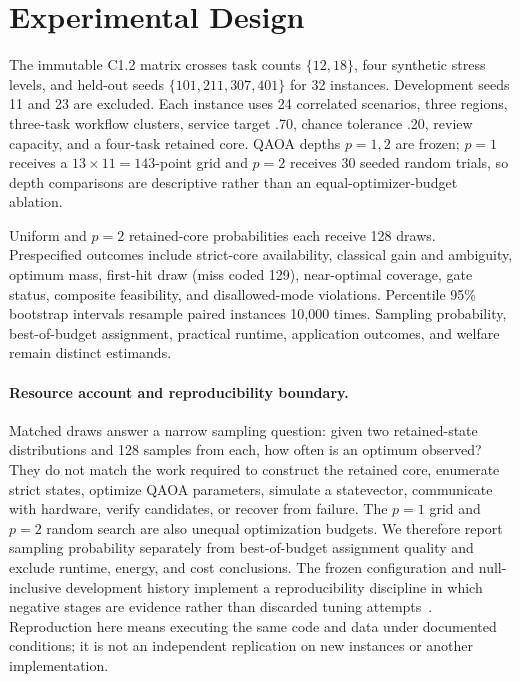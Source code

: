 \section{Experimental Design}
\label{sec:design}
\label{sec:experiments}

The immutable C1.2 matrix crosses task counts $\{12,18\}$, four synthetic stress levels, and held-out seeds $\{101,211,307,401\}$ for 32 instances. Development seeds 11 and 23 are excluded. Each instance uses 24 correlated scenarios, three regions, three-task workflow clusters, service target .70, chance tolerance .20, review capacity, and a four-task retained core. QAOA depths $p=1,2$ are frozen; $p=1$ receives a $13\times11=143$-point grid and $p=2$ receives 30 seeded random trials, so depth comparisons are descriptive rather than an equal-optimizer-budget ablation.

Uniform and $p=2$ retained-core probabilities each receive 128 draws. Prespecified outcomes include strict-core availability, classical gain and ambiguity, optimum mass, first-hit draw (miss coded 129), near-optimal coverage, gate status, composite feasibility, and disallowed-mode violations. Percentile 95\% bootstrap intervals resample paired instances 10,000 times. Sampling probability, best-of-budget assignment, practical runtime, application outcomes, and welfare remain distinct estimands.

\paragraph{Resource account and reproducibility boundary.}
Matched draws answer a narrow sampling question: given two retained-state distributions and 128 samples from each, how often is an optimum observed? They do not match the work required to construct the retained core, enumerate strict states, optimize QAOA parameters, simulate a statevector, communicate with hardware, verify candidates, or recover from failure. The $p=1$ grid and $p=2$ random search are also unequal optimization budgets. We therefore report sampling probability separately from best-of-budget assignment quality and exclude runtime, energy, and cost conclusions. The frozen configuration and null-inclusive development history implement a reproducibility discipline in which negative stages are evidence rather than discarded tuning attempts~\citep{pineau2021reproducibility}. Reproduction here means executing the same code and data under documented conditions; it is not an independent replication on new instances or another implementation.

